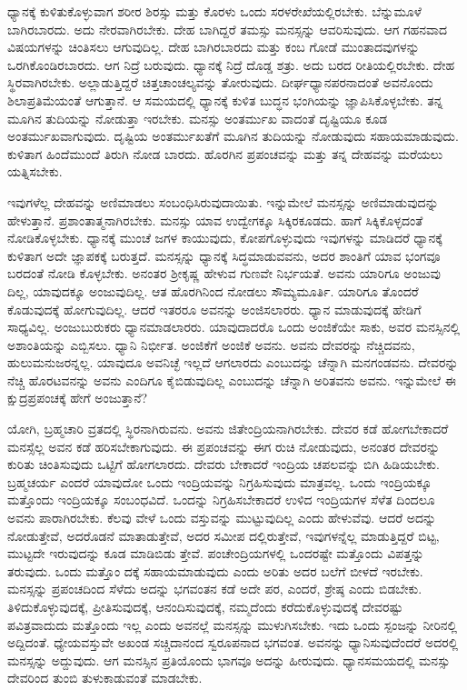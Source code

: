 ಧ್ಯಾನಕ್ಕೆ ಕುಳಿತುಕೊಳ್ಳುವಾಗ ಶರೀರ ಶಿರಸ್ಸು ಮತ್ತು ಕೊರಳು ಒಂದು ಸರಳರೇಖೆಯಲ್ಲಿರಬೇಕು. ಬೆನ್ನುಮೂಳೆ ಬಾಗಿರಬಾರದು. ಅದು ನೇರವಾಗಿರಬೇಕು. ದೇಹ ಬಾಗಿದ್ದರೆ ತಮಸ್ಸು ಮನಸ್ಸನ್ನು ಆವರಿಸುವುದು. ಆಗ ಗಹನವಾದ ವಿಷಯಗಳನ್ನು ಚಿಂತಿಸಲು ಆಗುವುದಿಲ್ಲ. ದೇಹ ಬಾಗಿರಬಾರದು ಮತ್ತು ಕಂಬ ಗೋಡೆ ಮುಂತಾದವುಗಳನ್ನು ಒರಗಿಕೊಂಡಿರಬಾರದು. ಆಗ ನಿದ್ರೆ ಬರುವುದು. ಧ್ಯಾನಕ್ಕೆ ನಿದ್ರೆ ದೊಡ್ಡ ಶತ್ರು. ಅದು ಬರದ ರೀತಿಯಲ್ಲಿರಬೇಕು. ದೇಹ ಸ್ಥಿರವಾಗಿರಬೇಕು. ಅಲ್ಲಾಡುತ್ತಿದ್ದರೆ ಚಿತ್ತಚಾಂಚಲ್ಯವನ್ನು ತೋರುವುದು. ದೀರ್ಘಧ್ಯಾನಪರನಾದಂತೆ ಅವನೊಂದು ಶಿಲಾಪ್ರತಿಮೆಯಂತೆ ಆಗುತ್ತಾನೆ. ಆ ಸಮಯದಲ್ಲಿ ಧ್ಯಾನಕ್ಕೆ ಕುಳಿತ ಬುದ್ಧನ ಭಂಗಿಯನ್ನು ಜ್ಞಾಪಿಸಿಕೊಳ್ಳಬೇಕು. ತನ್ನ ಮೂಗಿನ ತುದಿಯನ್ನು ನೋಡುತ್ತಾ ಇರಬೇಕು. ಮನಸ್ಸು ಅಂತರ್ಮುಖ ವಾದಂತೆ ದೃಷ್ಟಿಯೂ ಕೂಡ ಅಂತರ್ಮುಖವಾಗುವುದು. ದೃಷ್ಟಿಯ ಅಂತರ್ಮುಖತೆಗೆ ಮೂಗಿನ ತುದಿಯನ್ನು ನೋಡುವುದು ಸಹಾಯಮಾಡುವುದು. ಕುಳಿತಾಗ ಹಿಂದೆಮುಂದೆ ತಿರುಗಿ ನೋಡ ಬಾರದು. ಹೊರಗಿನ ಪ್ರಪಂಚವನ್ನು ಮತ್ತು ತನ್ನ ದೇಹವನ್ನು ಮರೆಯಲು ಯತ್ನಿಸಬೇಕು.

ಇವುಗಳೆಲ್ಲ ದೇಹವನ್ನು ಅಣಿಮಾಡಲು ಸಂಬಂಧಿಸಿರುವುದಾಯಿತು. ಇನ್ನುಮೇಲೆ ಮನಸ್ಸನ್ನು ಅಣಿಮಾಡುವುದನ್ನು ಹೇಳುತ್ತಾನೆ. ಪ್ರಶಾಂತಾತ್ಮನಾಗಿರಬೇಕು. ಮನಸ್ಸು ಯಾವ ಉದ್ವೇಗಕ್ಕೂ ಸಿಕ್ಕಿರಕೂಡದು. ಹಾಗೆ ಸಿಕ್ಕಿಕೊಳ್ಳದಂತೆ ನೋಡಿಕೊಳ್ಳಬೇಕು. ಧ್ಯಾನಕ್ಕೆ ಮುಂಚೆ ಜಗಳ ಕಾಯುವುದು, ಕೋಪಗೊಳ್ಳುವುದು ಇವುಗಳನ್ನು ಮಾಡಿದರೆ ಧ್ಯಾನಕ್ಕೆ ಕುಳಿತಾಗ ಅದೇ ಜ್ಞಾಪಕಕ್ಕೆ ಬರುತ್ತದೆ. ಮನಸ್ಸನ್ನು ಧ್ಯಾನಕ್ಕೆ ಸಿದ್ಧಮಾಡುವವನು, ಅದರ ಶಾಂತಿಗೆ ಯಾವ ಭಂಗವೂ ಬರದಂತೆ ನೋಡಿ ಕೊಳ್ಳಬೇಕು. ಅನಂತರ ಶ‍್ರೀಕೃಷ್ಣ ಹೇಳುವ ಗುಣವೇ ನಿರ್ಭಯತೆ. ಅವನು ಯಾರಿಗೂ ಅಂಜುವು ದಿಲ್ಲ, ಯಾವುದಕ್ಕೂ ಅಂಜುವುದಿಲ್ಲ. ಆತ ಹೊರಗಿನಿಂದ ನೋಡಲು ಸೌಮ್ಯಮೂರ್ತಿ. ಯಾರಿಗೂ ತೊಂದರೆ ಕೊಡುವುದಕ್ಕೆ ಹೋಗುವುದಿಲ್ಲ. ಆದರೆ ಇತರರೂ ಅವನನ್ನು ಅಂಜಿಸಲಾರರು. ಧ್ಯಾನ ಮಾಡುವುದಕ್ಕೆ ಹೇಡಿಗೆ ಸಾಧ್ಯವಿಲ್ಲ. ಅಂಜುಬುರುಕರು ಧ್ಯಾನಮಾಡಲಾರರು. ಯಾವುದಾದರೊ ಒಂದು ಅಂಜಿಕೆಯೇ ಸಾಕು, ಅವರ ಮನಸ್ಸಿನಲ್ಲಿ ಅಶಾಂತಿಯನ್ನು ಎಬ್ಬಿಸಲು. ಧ್ಯಾನಿ ನಿರ್ಭೀತ. ಅಂಜಿಕೆಗೆ ಅಂಜಿಕೆ ಅವನು. ಅವನು ದೇವರನ್ನು ನೆಚ್ಚಿದವನು, ಹುಲುಮನುಜರನ್ನಲ್ಲ. ಯಾವುದೂ ಅವನಿಚ್ಛೆ ಇಲ್ಲದೆ ಆಗಲಾರದು ಎಂಬುದನ್ನು ಚೆನ್ನಾಗಿ ಮನಗಂಡವನು. ದೇವರನ್ನು ನೆಚ್ಚಿ ಹೊರಟವನನ್ನು ಅವನು ಎಂದಿಗೂ ಕೈಬಿಡುವುದಿಲ್ಲ ಎಂಬುದನ್ನು ಚೆನ್ನಾಗಿ ಅರಿತವನು ಅವನು. ಇನ್ನುಮೇಲೆ ಈ ಕ್ಷುದ್ರಪ್ರಪಂಚಕ್ಕೆ ಹೇಗೆ ಅಂಜುತ್ತಾನೆ?

ಯೋಗಿ, ಬ್ರಹ್ಮಚಾರಿ ವ್ರತದಲ್ಲಿ ಸ್ಥಿರನಾಗಿರುವನು. ಅವನು ಜಿತೇಂದ್ರಿಯನಾಗಿರಬೇಕು. ದೇವರ ಕಡೆ ಹೋಗಬೇಕಾದರೆ ಮನಸ್ಸೆಲ್ಲ ಅವನ ಕಡೆ ಹರಿಸಬೇಕಾಗುವುದು. ಈ ಪ್ರಪಂಚವನ್ನು ಈಗ ರುಚಿ ನೋಡುವುದು, ಅನಂತರ ದೇವರನ್ನು ಕುರಿತು ಚಿಂತಿಸುವುದು ಒಟ್ಟಿಗೆ ಹೋಗಲಾರದು. ದೇವರು ಬೇಕಾದರೆ ಇಂದ್ರಿಯ ಚಪಲವನ್ನು ಬಿಗಿ ಹಿಡಿಯಬೇಕು. ಬ್ರಹ್ಮಚರ್ಯ ಎಂದರೆ ಯಾವುದೋ ಒಂದು ಇಂದ್ರಿಯವನ್ನು ನಿಗ್ರಹಿಸುವುದು ಮಾತ್ರವಲ್ಲ. ಒಂದು ಇಂದ್ರಿಯಕ್ಕೂ ಮತ್ತೊಂದು ಇಂದ್ರಿಯಕ್ಕೂ ಸಂಬಂಧವಿದೆ. ಒಂದನ್ನು ನಿಗ್ರಹಿಸಬೇಕಾದರೆ ಉಳಿದ ಇಂದ್ರಿಯಗಳ ಸೆಳೆತ ದಿಂದಲೂ ಅವನು ಪಾರಾಗಿರಬೇಕು. ಕೆಲವು ವೇಳೆ ಒಂದು ವಸ್ತುವನ್ನು ಮುಟ್ಟುವುದಿಲ್ಲ ಎಂದು ಹೇಳುವೆವು. ಆದರೆ ಅದನ್ನು ನೋಡುತ್ತೇವೆ, ಅದರೊಡನೆ ಮಾತಾಡುತ್ತೇವೆ, ಅದರ ಸಮೀಪ ದಲ್ಲಿರುತ್ತೇವೆ, ಇವುಗಳನ್ನೆಲ್ಲ ಮಾಡುತ್ತಿದ್ದರೆ ಬಿಟ್ಟ, ಮುಟ್ಟದೇ ಇರುವುದನ್ನು ಕೂಡ ಮಾಡಿಬಿಡು ತ್ತೇವೆ. ಪಂಚೇಂದ್ರಿಯಗಳಲ್ಲಿ ಒಂದರಷ್ಟೇ ಮತ್ತೊಂದು ವಿಪತ್ತನ್ನು ತರುವುದು. ಒಂದು ಮತ್ತೊಂ ದಕ್ಕೆ ಸಹಾಯಮಾಡುವುದು ಎಂದು ಅರಿತು ಅದರ ಬಲೆಗೆ ಬೀಳದೆ ಇರಬೇಕು. ಮನಸ್ಸನ್ನು ಪ್ರಪಂಚದಿಂದ ಸೆಳೆದು ಅದನ್ನು ಭಗವಂತನ ಕಡೆ ಅದೇ ಪರ, ಎಂದರೆ, ಶ್ರೇಷ್ಠ ಎಂದು ಬಿಡಬೇಕು. ತಿಳಿದುಕೊಳ್ಳುವುದಕ್ಕೆ, ಪ್ರೀತಿಸುವುದಕ್ಕೆ, ಆನಂದಿಸುವುದಕ್ಕೆ, ನಮ್ಮದೆಂದು ಕರೆದುಕೊಳ್ಳುವುದಕ್ಕೆ ದೇವರಷ್ಟು ಪವಿತ್ರವಾದುದು ಮತ್ತೊಂದು ಇಲ್ಲ ಎಂದು ಅವನಲ್ಲೆ ಮನಸ್ಸನ್ನು ಮುಳುಗಿಸಬೇಕು. ಇದು ಒಂದು ಸ್ಪಂಜನ್ನು ನೀರಿನಲ್ಲಿ ಅದ್ದಿದಂತೆ. ಧ್ಯೇಯವಸ್ತುವೇ ಅಖಂಡ ಸಚ್ಚಿದಾನಂದ ಸ್ವರೂಪನಾದ ಭಗವಂತ. ಅವನನ್ನು ಧ್ಯಾನಿಸುವುದೆಂದರೆ ಅದರಲ್ಲಿ ಮನಸ್ಸನ್ನು ಅದ್ದುವುದು. ಆಗ ಮನಸ್ಸಿನ ಪ್ರತಿಯೊಂದು ಭಾಗವೂ ಅದನ್ನು ಹೀರುವುದು. ಧ್ಯಾನಸಮಯದಲ್ಲಿ ಮನಸ್ಸು ದೇವರಿಂದ ತುಂಬಿ ತುಳುಕಾಡುವಂತೆ ಮಾಡಬೇಕು.

